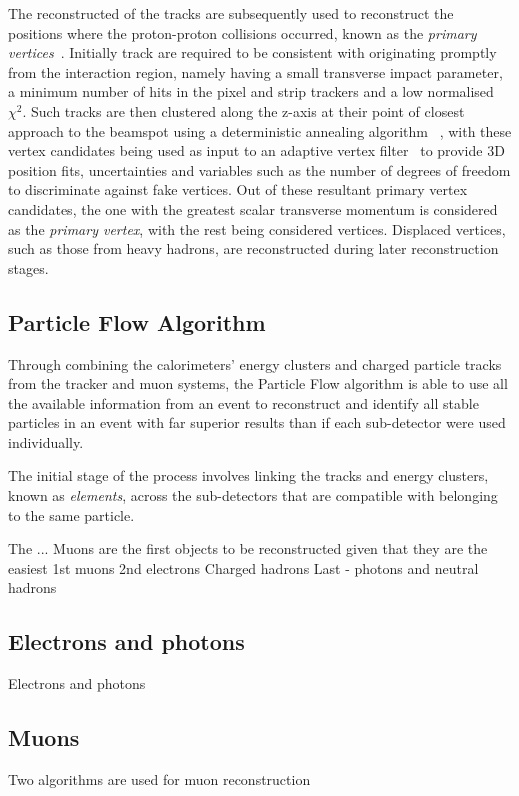 {%
The reconstructed of the tracks are subsequently used to reconstruct the positions where the proton-proton collisions occurred, known as the \emph{primary vertices}~\cite{Speer:2006mh,Chatrchyan:2014fea}.
Initially track are required to be consistent with originating promptly from the interaction region, namely having a small transverse impact parameter, a minimum number of hits in the pixel and strip trackers and a low normalised $\chi^{2}$.
Such tracks are then clustered along the z-axis at their point of closest approach to the beamspot using a deterministic annealing algorithm	~\cite{Kenneth:1998i}, with these vertex candidates being used as input to an adaptive vertex filter~\cite{Fruhwirth:2007hz} to provide 3D position fits, uncertainties and variables such as the number of degrees of freedom to discriminate against fake vertices.
Out of these resultant primary vertex candidates, the one with the greatest scalar transverse momentum is considered as the \emph{primary vertex}, with the rest being considered \PU vertices.
Displaced vertices, such as those from heavy hadrons, are reconstructed during later reconstruction stages.

\subsection{Particle Flow Algorithm}
Through combining the calorimeters' energy clusters and charged particle tracks from the tracker and muon systems, the Particle Flow algorithm is able to use all the available information from an event to reconstruct and identify all stable particles in an event with far superior results than if each sub-detector were used individually.

The initial stage of the process involves linking the tracks and energy clusters, known as \emph{elements}, across the sub-detectors that are compatible with belonging to the same particle.

The ...
Muons are the first objects to be reconstructed given that they are the easiest 
1st muons
2nd electrons
Charged hadrons
Last - photons and neutral hadrons

\subsection{Electrons and photons}
Electrons and photons 
\subsection{Muons}
Two algorithms are used for muon reconstruction 

}
